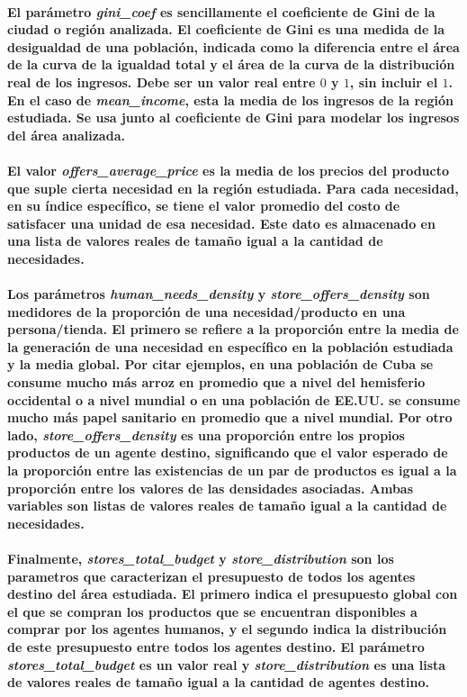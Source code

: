 \documentclass[12pt]{amsart}
\begin{document}
\paragraph{El parámetro \textit{gini\_coef} es sencillamente el coeficiente de Gini \cite{vars2} de la ciudad o región analizada. El coeficiente de Gini es una medida de la desigualdad de una población, indicada como la diferencia entre el área de la curva de la igualdad total y el área de la curva de la distribución real de los ingresos. Debe ser un valor real entre $0$ y $1$, sin incluir el $1$. En el caso de \textit{mean\_income}, esta la media de los ingresos de la región estudiada. Se usa junto al coeficiente de Gini para modelar los ingresos del área analizada.}

\paragraph{El valor \textit{offers\_average\_price} es la media de los precios del producto que suple cierta necesidad en la región estudiada. Para cada necesidad, en su índice específico, se tiene el valor promedio del costo de satisfacer una unidad de esa necesidad. Este dato es almacenado en una lista de valores reales de tamaño igual a la cantidad de necesidades.}

\paragraph{Los parámetros \textit{human\_needs\_density} y \textit{store\_offers\_density} son medidores de la proporción de una necesidad/producto en una persona/tienda. El primero se refiere a la proporción entre la media de la generación de una necesidad en específico en la población estudiada y la media global. Por citar ejemplos, en una población de Cuba se consume mucho más arroz en promedio que a nivel del hemisferio occidental o a nivel mundial o en una población de EE.UU. se consume mucho más papel sanitario en promedio que a nivel mundial. Por otro lado, \textit{store\_offers\_density} es una proporción entre los propios productos de un agente destino, significando que el valor esperado de la proporción entre las existencias de un par de productos es igual a la proporción entre los valores de las densidades asociadas. Ambas variables son listas de valores reales de tamaño igual a la cantidad de necesidades.}

\paragraph{Finalmente,  \textit{stores\_total\_budget} y  \textit{store\_distribution} son los parametros que caracterizan el presupuesto de todos los agentes destino del área estudiada. El primero indica el presupuesto global con el que se compran los productos que se encuentran disponibles a comprar por los agentes humanos, y el segundo indica la distribución de este presupuesto entre todos los agentes destino. El parámetro \textit{stores\_total\_budget}  es un valor real y \textit{store\_distribution} es una lista de valores reales de tamaño igual a la cantidad de agentes destino.}
\end{document}

